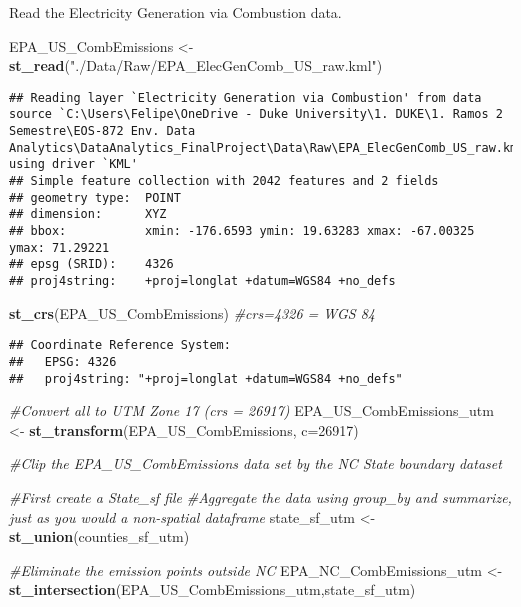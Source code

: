 \documentclass[12pt,]{article}
\newenvironment{Shaded}{\begin{snugshade}}{\end{snugshade}}
\newcommand{\KeywordTok}[1]{\textcolor[rgb]{0.13,0.29,0.53}{\textbf{#1}}}
\newcommand{\DataTypeTok}[1]{\textcolor[rgb]{0.13,0.29,0.53}{#1}}
\newcommand{\DecValTok}[1]{\textcolor[rgb]{0.00,0.00,0.81}{#1}}
\newcommand{\StringTok}[1]{\textcolor[rgb]{0.31,0.60,0.02}{#1}}
\newcommand{\CommentTok}[1]{\textcolor[rgb]{0.56,0.35,0.01}{\textit{#1}}}
\newcommand{\NormalTok}[1]{#1}
\begin{document}
Read the Electricity Generation via Combustion data.

\begin{Shaded}
\begin{Highlighting}[]
\NormalTok{EPA_US_CombEmissions <-}\StringTok{ }\KeywordTok{st_read}\NormalTok{(}\StringTok{"./Data/Raw/EPA_ElecGenComb_US_raw.kml"}\NormalTok{)}
\end{Highlighting}
\end{Shaded}

\begin{verbatim}
## Reading layer `Electricity Generation via Combustion' from data source `C:\Users\Felipe\OneDrive - Duke University\1. DUKE\1. Ramos 2 Semestre\EOS-872 Env. Data Analytics\DataAnalytics_FinalProject\Data\Raw\EPA_ElecGenComb_US_raw.kml' using driver `KML'
## Simple feature collection with 2042 features and 2 fields
## geometry type:  POINT
## dimension:      XYZ
## bbox:           xmin: -176.6593 ymin: 19.63283 xmax: -67.00325 ymax: 71.29221
## epsg (SRID):    4326
## proj4string:    +proj=longlat +datum=WGS84 +no_defs
\end{verbatim}

\begin{Shaded}
\begin{Highlighting}[]
\KeywordTok{st_crs}\NormalTok{(EPA_US_CombEmissions) }\CommentTok{#crs=4326 = WGS 84}
\end{Highlighting}
\end{Shaded}

\begin{verbatim}
## Coordinate Reference System:
##   EPSG: 4326 
##   proj4string: "+proj=longlat +datum=WGS84 +no_defs"
\end{verbatim}

\begin{Shaded}
\begin{Highlighting}[]
\CommentTok{#Convert all to UTM Zone 17 (crs = 26917)}
\NormalTok{EPA_US_CombEmissions_utm <-}\StringTok{ }\KeywordTok{st_transform}\NormalTok{(EPA_US_CombEmissions, }\DataTypeTok{c=}\DecValTok{26917}\NormalTok{)}

\CommentTok{#Clip the EPA_US_CombEmissions data set by the NC State boundary dataset}

\CommentTok{#First create a State_sf file}
\CommentTok{#Aggregate the data using group_by and summarize, just as you would a non-spatial dataframe}
\NormalTok{state_sf_utm <-}\StringTok{ }\KeywordTok{st_union}\NormalTok{(counties_sf_utm)}

\CommentTok{#Eliminate the emission points outside NC}
\NormalTok{EPA_NC_CombEmissions_utm <-}\StringTok{ }\KeywordTok{st_intersection}\NormalTok{(EPA_US_CombEmissions_utm,state_sf_utm) }
\end{Highlighting}
\end{Shaded}
\end{document}
